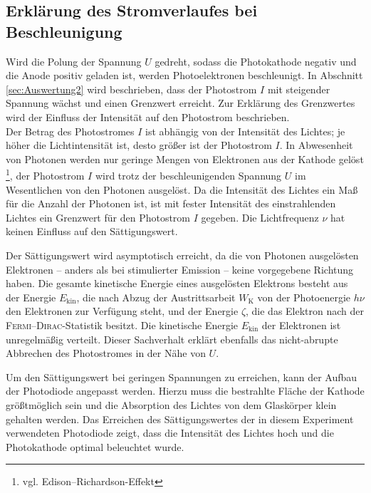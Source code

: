\subsection{Erklärung des Stromverlaufes bei Beschleunigung} %
\label{sub:Diskussion4}
Wird die Polung der Spannung $U$ gedreht, sodass die Photokathode negativ und die Anode positiv geladen ist, 
werden Photoelektronen beschleunigt.
In Abschnitt \ref{sec:Auswertung2} wird beschrieben, dass der Photostrom $I$ mit steigender Spannung wächst und einen Grenzwert erreicht.
Zur Erklärung des Grenzwertes wird der Einfluss der Intensität auf den Photostrom beschrieben.\\
Der Betrag des Photostromes $I$ ist abhängig von der Intensität des Lichtes; je höher die Lichtintensität ist, desto größer ist der Photostrom $I$.
In Abwesenheit von Photonen werden nur geringe Mengen von Elektronen aus der Kathode gelöst \footnote{vgl. Edison--Richardson-Effekt}, der Photostrom $I$ wird trotz der beschleunigenden Spannung $U$ im Wesentlichen von den Photonen ausgelöst.
Da die Intensität des Lichtes ein Maß für die Anzahl der Photonen ist, ist mit fester Intensität des einstrahlenden Lichtes ein Grenzwert für den Photostrom $I$ gegeben.
Die Lichtfrequenz $\nu$ hat keinen Einfluss auf den Sättigungswert.

Der Sättigungswert wird asymptotisch erreicht, da die von Photonen ausgelösten Elektronen -- anders als bei stimulierter Emission -- keine vorgegebene Richtung haben.
Die gesamte kinetische Energie eines ausgelösten Elektrons besteht aus der Energie $E_\text{kin}$, die nach Abzug der Austrittsarbeit $W_\text{K}$ von der Photoenergie $h\nu$ den Elektronen zur Verfügung steht, 
und der Energie $\zeta$, die das Elektron nach der \textsc{Fermi}--\textsc{Dirac}-Statistik besitzt.
Die kinetische Energie $E_\text{kin}$ der Elektronen ist unregelmäßig verteilt.
Dieser Sachverhalt erklärt ebenfalls das nicht-abrupte Abbrechen des Photostromes in der Nähe von $U$.

Um den Sättigungswert bei geringen Spannungen zu erreichen, kann der Aufbau der Photodiode angepasst werden.
Hierzu muss die bestrahlte Fläche der Kathode größtmöglich sein und 
die Absorption des Lichtes von dem Glaskörper klein gehalten werden.
Das Erreichen des Sättigungswertes der in diesem Experiment verwendeten Photodiode zeigt, dass die Intensität des Lichtes hoch und die Photokathode optimal beleuchtet wurde.

